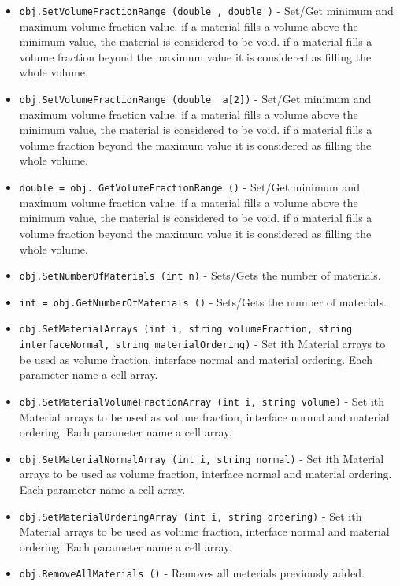 \begin{itemize}
\item  \verb|obj.SetVolumeFractionRange (double , double )| -  Set/Get minimum and maximum volume fraction value. if a material fills a volume above the minimum value, the material is considered to be void. if a material fills a volume fraction beyond the maximum value it is considered as filling the whole volume.

\item  \verb|obj.SetVolumeFractionRange (double  a[2])| -  Set/Get minimum and maximum volume fraction value. if a material fills a volume above the minimum value, the material is considered to be void. if a material fills a volume fraction beyond the maximum value it is considered as filling the whole volume.

\item  \verb|double = obj. GetVolumeFractionRange ()| -  Set/Get minimum and maximum volume fraction value. if a material fills a volume above the minimum value, the material is considered to be void. if a material fills a volume fraction beyond the maximum value it is considered as filling the whole volume.

\item  \verb|obj.SetNumberOfMaterials (int n)| -  Sets/Gets the number of materials.

\item  \verb|int = obj.GetNumberOfMaterials ()| -  Sets/Gets the number of materials.

\item  \verb|obj.SetMaterialArrays (int i, string volumeFraction, string interfaceNormal, string materialOrdering)| -  Set ith Material arrays to be used as volume fraction, interface normal and material ordering. Each parameter name a cell array.

\item  \verb|obj.SetMaterialVolumeFractionArray (int i, string volume)| -  Set ith Material arrays to be used as volume fraction, interface normal and material ordering. Each parameter name a cell array.

\item  \verb|obj.SetMaterialNormalArray (int i, string normal)| -  Set ith Material arrays to be used as volume fraction, interface normal and material ordering. Each parameter name a cell array.

\item  \verb|obj.SetMaterialOrderingArray (int i, string ordering)| -  Set ith Material arrays to be used as volume fraction, interface normal and material ordering. Each parameter name a cell array.

\item  \verb|obj.RemoveAllMaterials ()| -  Removes all meterials previously added.

\end{itemize}
